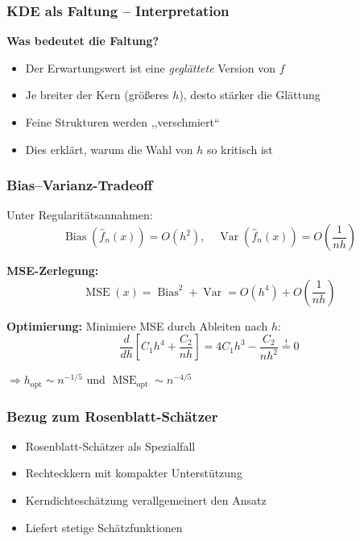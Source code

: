 \documentclass{beamer}
\newif\ifpauseswitch
\begin{document}
	\begin{frame}
		\frametitle{KDE als Faltung – Interpretation}
		
		\textbf{Was bedeutet die Faltung?}
		\begin{itemize}
			\item Der Erwartungswert ist eine \textit{geglättete} Version von $f$
			\item Je breiter der Kern (größeres $h$), desto stärker die Glättung
			\item Feine Strukturen werden ,,verschmiert``
		\end{itemize}
		
		\vspace{0.5em}
		
		\begin{itemize}
			\item Dies erklärt, warum die Wahl von $h$ so kritisch ist
		\end{itemize}
	\end{frame}
	
	
	\begin{frame}
		\frametitle{Bias--Varianz-Tradeoff}
		
		Unter Regularitätsannahmen:
		\[
		\operatorname{Bias}(\hat f_n(x)) = O(h^2),
		\quad
		\operatorname{Var}(\hat f_n(x)) = O\left(\frac{1}{nh}\right)
		\]
		
		\ifpauseswitch
		\pause
		\fi
		
		\textbf{MSE-Zerlegung:}
		\[
		\operatorname{MSE}(x) = \operatorname{Bias}^2 + \operatorname{Var} = O(h^4) + O\left(\frac{1}{nh}\right)
		\]
		
		\ifpauseswitch
		\pause
		\fi
		
		\textbf{Optimierung:} Minimiere MSE durch Ableiten nach $h$:
		\[
		\frac{d}{dh}\left[C_1 h^4 + \frac{C_2}{nh}\right] = 4C_1 h^3 - \frac{C_2}{nh^2} \stackrel{!}{=} 0
		\]
		
		\alert{$\Rightarrow h_{\text{opt}} \sim n^{-1/5}$ und $\operatorname{MSE}_{\text{opt}} \sim n^{-4/5}$}
	\end{frame}
	
	
	\begin{frame}
		\frametitle{Bezug zum Rosenblatt-Schätzer}
		
		\begin{itemize}
			\item Rosenblatt-Schätzer als Spezialfall
			\item Rechteckkern mit kompakter Unterstützung
		\end{itemize}
		
		\vspace{0.5em}
		
		\begin{itemize}
			\item Kerndichteschätzung verallgemeinert den Ansatz
			\item Liefert stetige Schätzfunktionen
		\end{itemize}
	\end{frame}
	
\end{document}
